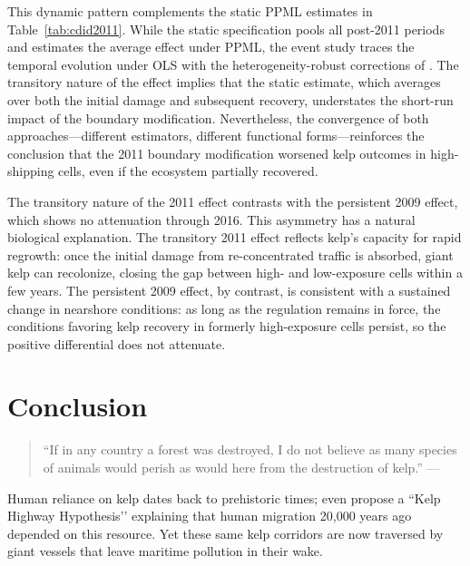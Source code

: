 \documentclass[12pt]{article}
\begin{document}
This dynamic pattern complements the static PPML estimates in Table~\ref{tab:cdid2011}. While the static specification pools all post-2011 periods and estimates the average effect under PPML, the event study traces the temporal evolution under OLS with the heterogeneity-robust corrections of \citet{Chaisemartin2024}. The transitory nature of the effect implies that the static estimate, which averages over both the initial damage and subsequent recovery, understates the short-run impact of the boundary modification. Nevertheless, the convergence of both approaches---different estimators, different functional forms---reinforces the conclusion that the 2011 boundary modification worsened kelp outcomes in high-shipping cells, even if the ecosystem partially recovered.

The transitory nature of the 2011 effect contrasts with the persistent 2009 effect, which shows no attenuation through 2016. This asymmetry has a natural biological explanation. The transitory 2011 effect reflects kelp's capacity for rapid regrowth: once the initial damage from re-concentrated traffic is absorbed, giant kelp can recolonize, closing the gap between high- and low-exposure cells within a few years. The persistent 2009 effect, by contrast, is consistent with a sustained change in nearshore conditions: as long as the regulation remains in force, the conditions favoring kelp recovery in formerly high-exposure cells persist, so the positive differential does not attenuate.

\section{Conclusion}

\begin{quotation}
``If in any country a forest was destroyed, I do not believe as many species of animals would perish as would here from the destruction of kelp.'' --- \citet{Darwin1839}
\end{quotation}
Human reliance on kelp dates back to prehistoric times; \citet{Erlandson2007} even propose a ``Kelp Highway Hypothesis’’ explaining that human migration 20,000 years ago depended on this resource. Yet these same kelp corridors are now traversed by giant vessels that leave maritime pollution in their wake.
\end{document}

